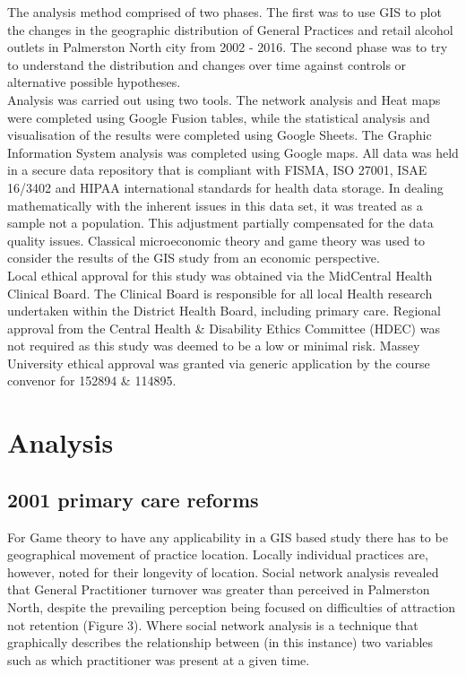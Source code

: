 \documentclass[11pt,a4paper]{article}
\begin{document}
The analysis method comprised of two phases. The first was to use GIS to plot the changes in the geographic distribution of General Practices and retail alcohol outlets in Palmerston North city from 2002 - 2016. The second phase was to try to understand the distribution and changes over time against controls or alternative possible hypotheses. \\

Analysis was carried out using two tools. The network analysis and Heat maps were completed using Google Fusion tables, while the statistical analysis and visualisation of the results were completed using Google Sheets. The Graphic Information System analysis was completed using Google maps. All data was held in a secure data repository that is compliant with FISMA, ISO 27001, ISAE 16/3402 and HIPAA international standards for health data storage. In dealing mathematically  with the inherent issues in this data set, it was treated as a sample not a population. This adjustment partially compensated for the data quality issues. Classical microeconomic theory and game theory was used to consider the results of the GIS study from an economic perspective. \\

Local ethical approval for this study was obtained via the MidCentral Health Clinical Board. The Clinical Board is responsible for all local Health research undertaken within the District Health Board, including primary care.  Regional approval from the Central Health \& Disability Ethics Committee (HDEC) was not required as this study was deemed to be  a low or minimal risk. Massey University ethical approval was granted via generic application by the course convenor for 152894 & 114895. \\

\section{Analysis}
\subsection{2001 primary care reforms}
For Game theory to have any applicability in a GIS based study there has to be geographical movement of practice location. Locally individual practices are, however,  noted for their longevity of location. Social network analysis revealed that General Practitioner turnover was greater than perceived in Palmerston North, despite the prevailing perception being focused on difficulties of attraction not retention (Figure 3). Where social network analysis is a technique that graphically describes the relationship between (in this instance) two variables such as which practitioner was present at a given time.\\
\end{document}
